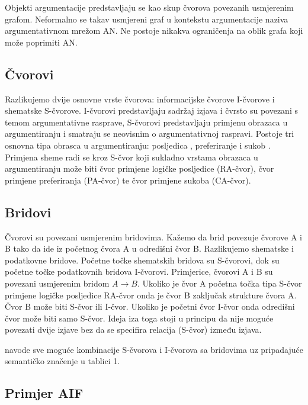 Objekti argumentacije predstavljaju se kao skup čvorova povezanih usmjerenim grafom. 
Neformalno se takav usmjereni graf u kontekstu argumentacije naziva
argumentativnom mrežom  AN\@. Ne 
postoje nikakva ograničenja na oblik grafa koji može poprimiti AN.

\subsection{Čvorovi}

Razlikujemo dvije osnovne vrste čvorova: informacijske čvorove
 I-čvorove i shematske  S-čvorove.
I-čvorovi predstavljaju sadržaj izjava i čvrsto su povezani s temom
argumentativne rasprave, S-čvorovi predstavljaju primjenu obrazaca u
argumentiranju i smatraju se neovisnim o argumentativnoj raspravi. Postoje tri
osnovna tipa obrasca u argumentiranju: posljedica ,
preferiranje  i sukob . Primjena sheme
radi se kroz S-čvor koji sukladno vrstama obrazaca u argumentiranju može biti
čvor primjene logičke posljedice  (RA-čvor), 
čvor primjene preferiranja  (PA-čvor) te
čvor primjene sukoba  (CA-čvor).

\subsection{Bridovi}

Čvorovi su povezani usmjerenim bridovima. Kažemo da brid povezuje čvorove A i B
tako da ide iz početnog čvora A u odredišni čvor B. Razlikujemo shematske i podatkovne
bridove. Početne točke shematskih bridova su S-čvorovi, dok su početne točke 
podatkovnih bridova I-čvorovi. Primjerice, čvorovi A i B su povezani usmjerenim bridom 
$A \rightarrow B$. Ukoliko je čvor A početna točka tipa
S-čvor primjene logičke posljedice RA-čvor onda je čvor B zaključak strukture
čvora A. Čvor B može biti S-čvor ili I-čvor. Ukoliko je početni čvor I-čvor onda
odredišni čvor može biti samo S-čvor. 
Ideja iza toga stoji u principu da nije moguće povezati dvije izjave bez da se
specifira relacija (S-čvor) između izjava. 

\cite{chesnevar2006towards} navode sve moguće kombinacije S-čvorova i I-čvorova
sa bridovima uz pripadajuće semantičko značenje u tablici 1. 

\subsection{Primjer AIF}

